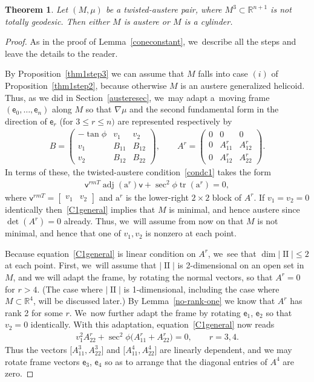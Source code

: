 \documentclass[10pt,a4paper]{amsart}
\def\R{\mathbb{R}}
\def\ve{\mathsf{e}}
\def\vv{\mathsf{v}}
\def\ba{\boldsymbol{\mathrm{a}}}
\def\adj{\operatorname{adj}}
\def\II{\operatorname{II}} %
\def\tr{\operatorname{tr}}
\newtheorem{Theorem}{Theorem}[section]
\numberwithin{equation}{section}
\begin{document}
\begin{Theorem} \label{thm:class}
Let $(M,\mu)$ be a twisted-austere pair, where $M^3 \subset \R^{n+1}$ is not totally geodesic. Then either $M$ is austere or $M$ is a cylinder.
\end{Theorem}
\begin{proof}
As in the proof of Lemma~\ref{coneconstant}, we~describe all the steps and leave the details to the reader.

By Proposition~\ref{thm1step3} we can assume that $M$ falls into case $(i)$ of Proposition~\ref{thm1step2}, because otherwise $M$ is an austere generalized helicoid. Thus, as we did in Section~\ref{austeresec}, we~may adapt a~moving frame $(\ve_0, \dots, \ve_n)$ along $M$ so that $\nabla \mu$ and the second fundamental form in the direction of $\ve_r$ (for $3 \le r\le n)$ are represented respectively by
\begin{gather*} %
B= \begin{pmatrix} -\tan\phi & v_1 & v_2 \\ v_1 & B_{11} & B_{12} \\ v_2 & B_{12} & B_{22} \end{pmatrix} ,
\qquad
A^r = \begin{pmatrix} 0 & 0 & 0 \\ 0 & A^r_{11} & A^r_{12} \\ 0 & A^r_{12} & A^r_{22}
\end{pmatrix} .
\end{gather*}
In terms of these, the twisted-austere condition~\eqref{condc1} takes the form
\begin{gather} \label{C1general}
\vv^{rm T} \adj(\ba^r) \vv + \sec^2\phi \tr(\ba^r) = 0,
\end{gather}
where $\vv^{rm T} = \begin{bmatrix} v_1 & v_2 \end{bmatrix}$ and $\ba^r$ is the lower-right $2\times 2$ block of $A^r$. If $v_1=v_2=0$ identically then~\eqref{C1general} implies that $M$ is minimal, and hence austere since $\det(A^r)=0$ already. Thus, we~will assume from now on that $M$ is not minimal, and hence that one of $v_1, v_2$ is nonzero at each point.

Because equation~\eqref{C1general} is linear condition on $A^r$, we~see that $\dim |\II| \le 2$ at each point. First, we~will assume that $|\II|$ is 2-dimensional on an open set in $M$, and we will adapt the frame, by rotating the normal vectors, so that $A^r=0$ for $r>4$. (The case where $|\II|$ is 1-dimensional, including the case where $M\subset \R^4$, will be discussed later.) By Lemma~\ref{no-rank-one} we know that $A^r$ has rank 2 for some $r$. We~now further adapt the frame by rotating $\ve_1$, $\ve_2$ so that $v_2=0$ identically. With this adaptation, equation~\eqref{C1general} now reads
\begin{gather*}
v_1^2 A^r_{22} + \sec^2\phi \big(A^r_{11} + A^r_{22}\big)=0,\qquad r=3,4.
\end{gather*}
Thus the vectors $\big[A^3_{11}, A^3_{22}\big]$ and $\big[A^4_{11}, A^4_{22}\big]$ are linearly dependent, and we may rotate frame vectors $\ve_3$, $\ve_4$ so as to arrange that the diagonal entries of $A^4$ are zero.


\end{proof}
\end{document}
